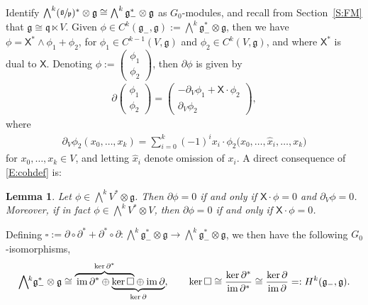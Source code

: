 \documentclass[10pt,a4paper]{amsart}
\newcommand\tensor{\otimes}
\DeclareMathOperator{\img}{im}
\newcommand{\g}{\mathfrak{g}}
\newcommand\fp{\mathfrak{p}}
\newcommand\fq {\mathfrak{q}}
\newcommand\sfX{\mathsf{X}}
\numberwithin{equation}{section}
\newtheorem{Lemma}[Theorem]{Lemma}
\begin{document}
Identify $\bigwedge^k (\sfrac{\g}{\fp})^* \otimes \g \cong \bigwedge^k \g_-^* \otimes \g$ as $G_0$-modules, and recall from Section~\ref{S:FM} that $\g \cong \fq \ltimes V$. Given $\phi \in C^k(\g_-,\g):=\bigwedge^k\g_-^* \tensor \g$, then we have $\phi = \sfX^* \wedge \phi_1 + \phi_2$, for $\phi_1 \in C^{k-1}(V,\g)$ and $\phi_2 \in C^k(V,\g)$, and where $\sfX^*$ is dual to $\sfX$. Denoting $\phi := \left(\begin{smallmatrix}
\phi_1\\
\phi_2
\end{smallmatrix}\right)$, then $\partial \phi $ is given by \cite[Lemma~3.4]{CDT2020}
\begin{align}\label{E:cohdef}
\partial \begin{pmatrix}
\phi_1\\
\phi_2
\end{pmatrix} = \begin{pmatrix}
-\partial_V \phi_1 + \sfX \cdot \phi_2\\
\partial_V \phi_2
\end{pmatrix},
\end{align}
where
\begin{align*}
\partial_V \phi_2(x_0,\dots,x_k) = \sum_{i=0}^k (-1)^i x_i \cdot \phi_2\bigl(x_0,\dots,\widehat{x}_i,\dots,x_k\bigr)
\end{align*}
 for $x_0,\dots,x_k \in V$, and letting $\widehat{x}_i$ denote omission of $x_i$. A direct consequence of \eqref{E:cohdef} is:
 \begin{Lemma}\label{L:X-ann}
Let $\phi\in \bigwedge^k V^*\tensor \g$. Then $\partial \phi = 0$ if and only if $\sfX \cdot \phi = 0$ and $\partial_V \phi = 0$. Moreover, if in fact $\phi \in \bigwedge^k V^* \tensor V$, then $\partial \phi = 0$ if and only if $\sfX \cdot \phi = 0$.
\end{Lemma}

 Defining $\square:=\partial \circ \partial^{\ast} + \partial^{\ast}\circ\partial \colon\bigwedge^k \g_-^* \otimes \g \to \bigwedge^k \g_-^* \otimes \g$, we then have the following $G_0$-isomorphisms,
\begin{align}\label{E:G0iso}
\bigwedge{}^{\!\!k}{\g_{-}^{\ast}\tensor \g} \cong
\rlap{$\overbrace{\phantom{\,\img \partial^{\ast} \oplus \ker\square}}^{\ker \partial^{\ast}}$}\img \partial^{\ast} \oplus
\underbrace{\ker \square \oplus \img \partial}_{\ker \partial},\qquad
\ker \square \cong \frac{\ker \partial^{\ast}}{\img \partial^{\ast}}\cong \frac{\ker \partial}{\img \partial}=:H^k(\g_{-},\g).
\end{align}
\end{document}
